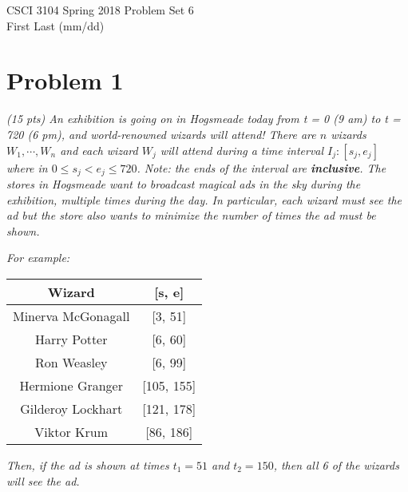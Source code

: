 \documentclass[12pt]{article}
\begin{document}
\noindent CSCI 3104 Spring 2018 \hfill Problem Set 6\\
First Last (mm/dd) 

\hrulefill

\selectfont

\section*{Problem 1}

\textit{(15 pts) An exhibition is going on in Hogsmeade today from t = 0 (9 am) to t = 720 (6
pm), and world-renowned wizards will attend! There are $n$ wizards $W_1, \cdots, W_n$ and
each wizard $W_j$ will attend during a time interval $I_j:[s_j,e_j]$ where in $0 \le s_j < e_j \le 720$. Note: the ends of the interval are \textbf{inclusive}. The stores in Hogsmeade want to
broadcast magical ads in the sky during the exhibition, multiple times during the day.
In particular, each wizard must see the ad but the store also wants to minimize the
number of times the ad must be shown.}

\textit{For example:}

\begin{center}
\centering
\begin{tabular}{c|c}
  Wizard & [s, e] \\
  \hline
  Minerva McGonagall & [3, 51] \\
  Harry Potter & [6, 60] \\
  Ron Weasley & [6, 99] \\
  Hermione Granger & [105, 155] \\
  Gilderoy Lockhart & [121, 178] \\
  Viktor Krum & [86, 186]
\end{tabular}
\end{center}

\textit{Then, if the ad is shown at times $t_1=51$ and $t_2 = 150$, then all 6 of the wizards will
see the ad.}

\pagebreak
\end{document}
